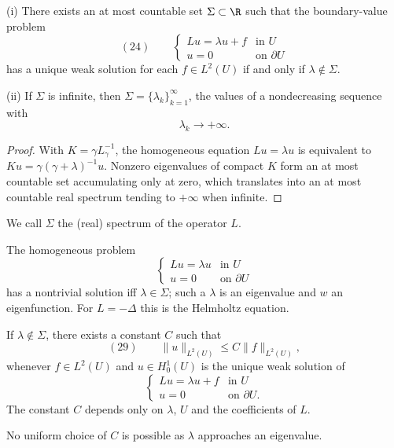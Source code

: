 \begin{theorem}
\label{thm:third-existence-spectrum}
(i) There exists an at most countable set $\Sigma \subset \R$ such that the boundary-value problem
$$(24) \qquad \begin{cases} Lu = \lambda u + f & \text{in } U \\ u = 0 & \text{on } \partial U \end{cases}$$
has a unique weak solution for each $f \in L^2(U)$ if and only if $\lambda \notin \Sigma$.

(ii) If $\Sigma$ is infinite, then $\Sigma = \{\lambda_k\}_{k=1}^\infty$, the values of a nondecreasing sequence with
$$\lambda_k \to +\infty.$$
\end{theorem}

\begin{proof}
\sketch With $K=\gamma L_\gamma^{-1}$, the homogeneous equation $Lu=\lambda u$ is equivalent to $Ku=\gamma(\gamma+\lambda)^{-1}u$. Nonzero eigenvalues of compact $K$ form an at most countable set accumulating only at zero, which translates into an at most countable real spectrum tending to $+\infty$ when infinite.
\end{proof}

\begin{definition}
\label{def:spectrum-of-operator}
We call $\Sigma$ the (real) spectrum of the operator $L$.
\end{definition}

\begin{remark}
\label{rem:eigenvalues-helmholtz-equation}
The homogeneous problem
$$\begin{cases} Lu = \lambda u & \text{in } U \\ u = 0 & \text{on } \partial U \end{cases}$$
has a nontrivial solution iff $\lambda\in\Sigma$; such a $\lambda$ is an eigenvalue and $w$ an eigenfunction. For $L=-\Delta$ this is the Helmholtz equation.
\end{remark}

\begin{theorem}
\label{thm:boundedness-of-inverse}
If $\lambda \notin \Sigma$, there exists a constant $C$ such that
$$(29) \qquad \|u\|_{L^2(U)} \leq C\|f\|_{L^2(U)},$$
whenever $f \in L^2(U)$ and $u \in H_0^1(U)$ is the unique weak solution of
$$\begin{cases} Lu = \lambda u + f & \text{in } U \\ u = 0 & \text{on } \partial U. \end{cases}$$
The constant $C$ depends only on $\lambda$, $U$ and the coefficients of $L$.

No uniform choice of $C$ is possible as $\lambda$ approaches an eigenvalue.
\end{theorem}

